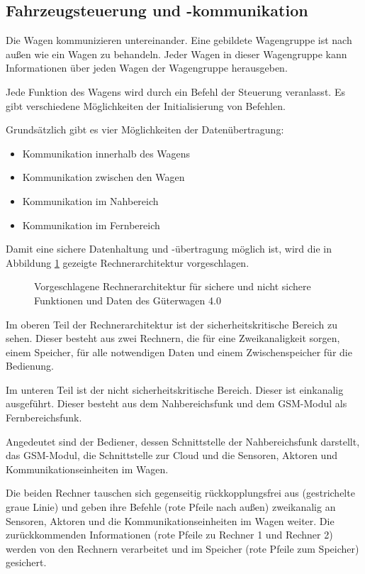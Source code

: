  \subsection{Fahrzeugsteuerung und -kommunikation}
Die Wagen kommunizieren untereinander. Eine gebildete Wagengruppe ist nach außen wie ein Wagen zu behandeln. Jeder Wagen in dieser Wagengruppe kann Informationen über jeden Wagen der Wagengruppe herausgeben.\par
Jede Funktion des Wagens wird durch ein Befehl der Steuerung veranlasst. Es gibt verschiedene Möglichkeiten der Initialisierung von Befehlen.\par
Grundsätzlich gibt es vier Möglichkeiten der Datenübertragung:
\begin{itemize}
    \item Kommunikation innerhalb des Wagens
    \item Kommunikation zwischen den Wagen
    \item Kommunikation im Nahbereich
    \item Kommunikation im Fernbereich
\end{itemize}
Damit eine sichere Datenhaltung und -übertragung möglich ist, wird die in Abbildung \ref{fig:Rechnerarchitektur} gezeigte Rechnerarchitektur vorgeschlagen.\par
\begin{figure}[ht]
    \centering
    
    \caption{Vorgeschlagene Rechnerarchitektur für sichere und nicht sichere Funktionen und Daten des Güterwagen 4.0}
    \label{fig:Rechnerarchitektur}
\end{figure}
Im oberen Teil der Rechnerarchitektur ist der sicherheitskritische Bereich zu sehen. %
Dieser besteht aus zwei Rechnern, die für eine Zweikanaligkeit sorgen, einem Speicher,  für alle notwendigen Daten und einem Zwischenspeicher für die Bedienung.\par
Im unteren Teil ist der nicht sicherheitskritische Bereich. Dieser ist einkanalig ausgeführt. Dieser besteht aus dem Nahbereichsfunk und dem GSM-Modul als Fernbereichsfunk.\par
Angedeutet sind der Bediener, dessen Schnittstelle der Nahbereichsfunk darstellt, das GSM-Modul, die Schnittstelle zur Cloud und die Sensoren, Aktoren und Kommunikationseinheiten im Wagen.\par
Die beiden Rechner tauschen sich gegenseitig rückkopplungsfrei aus (gestrichelte graue Linie) und geben ihre Befehle (rote Pfeile nach außen) zweikanalig an Sensoren, Aktoren und die Kommunikationseinheiten im Wagen weiter. Die zurückkommenden Informationen (rote Pfeile zu Rechner 1 und Rechner 2) werden von den Rechnern verarbeitet und im Speicher (rote Pfeile zum Speicher) gesichert.\par

